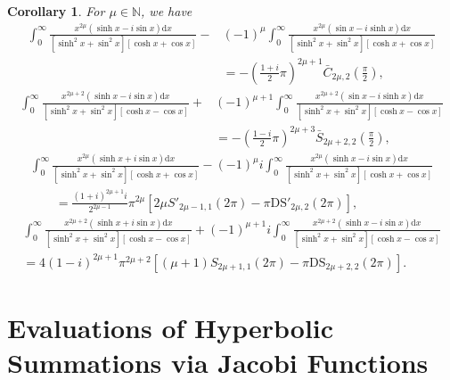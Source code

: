 \documentclass[11pt]{article}
\let\oldsection\section
\renewcommand\section{\setcounter{equation}{0}\oldsection}
\def\N{\mathbb{N}}
\theoremstyle{plain}
\newtheorem{cor}[thm]{Corollary}
\theoremstyle{definition}
\begin{document}
\begin{cor}
	For $\mu\in \N$, we have
	\begin{align}
		\int_0^{\infty}{\frac{x^{2\mu}\left( \sinh x-i\sin x \right) \mathrm{d}x}{\left[ \sinh ^2x+\sin ^2x \right] \left[ \cosh x+\cos x \right]}}-&\left( -1 \right) ^{\mu}\int_0^{\infty}{\frac{x^{2\mu}\left( \sin x-i\sinh x \right) \mathrm{d}x}{\left[ \sinh ^2x+\sin ^2x \right] \left[ \cosh x+\cos x \right]}}
		\nonumber\\
		&=-\left( \frac{1+i}{2}\pi \right) ^{2\mu +1}\bar{C}_{2\mu,2}\left( \frac{\pi}{2} \right),
	\end{align}
	\begin{align}
		\int_0^{\infty}{\frac{x^{2\mu+2}\left( \sinh x-i\sin x \right) \mathrm{d}x}{\left[ \sinh ^2x+\sin ^2x \right] \left[ \cosh x-\cos x \right]}}+&\left( -1 \right) ^{\mu+1}\int_0^{\infty}{\frac{x^{2\mu+2}\left( \sin x-i\sinh x \right) \mathrm{d}x}{\left[ \sinh ^2x+\sin ^2x \right] \left[ \cosh x-\cos x \right]}}
		\nonumber\\
		&=-\left( \frac{1-i}{2}\pi \right) ^{2\mu +3}\bar{S}_{2\mu+2,2}\left( \frac{\pi}{2} \right),
	\end{align}
	\begin{align}
		\int_0^{\infty}{\frac{x^{2\mu}\left( \sinh x+i\sin x \right) \mathrm{d}x}{\left[ \sinh ^2x+\sin ^2x \right] \left[ \cosh x+\cos x \right]}}-\left( -1 \right) ^{\mu}i\int_0^{\infty}{\frac{x^{2\mu}\left( \sinh x-i\sin x \right) \mathrm{d}x}{\left[ \sinh ^2x+\sin ^2x \right] \left[ \cosh x+\cos x \right]}}
		\nonumber\\
		\quad \quad =
		\frac{\left( 1+i \right) ^{2\mu +1}i}{2^{2\mu -1}}\pi ^{2\mu}\left[ 2\mu S'_{2\mu -1,1}\left( 2\pi \right) -\pi \mathrm{DS}'_{2\mu ,2}\left( 2\pi \right) \right],
	\end{align}	
	\begin{align}
		\int_0^{\infty}{\frac{x^{2\mu+2}\left( \sinh x+i\sin x \right) \mathrm{d}x}{\left[ \sinh ^2x+\sin ^2x \right] \left[ \cosh x-\cos x \right]}}+\left( -1 \right) ^{\mu+1}i\int_0^{\infty}{\frac{x^{2\mu+2}\left( \sinh x-i\sin x \right) \mathrm{d}x}{\left[ \sinh ^2x+\sin ^2x \right] \left[ \cosh x-\cos x \right]}}
		\nonumber\\=
		4\left( 1-i \right) ^{2\mu+1}\pi ^{2\mu+2} \left[ (\mu+1) S_{2\mu+1,1}\left( 2\pi \right) -\pi \mathrm{DS}_{2\mu+2 ,2}\left( 2\pi \right) \right].
	\end{align}
\end{cor}

\section{Evaluations of Hyperbolic Summations via Jacobi Functions}
\end{document}
